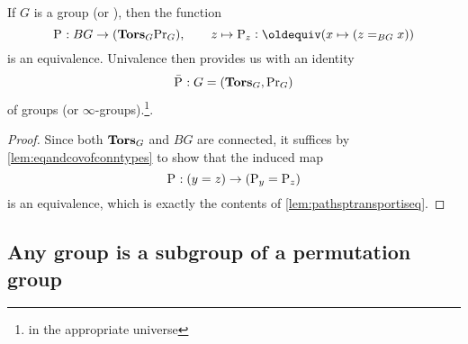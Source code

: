 \begin{theorem}\label{lem:BGbytorsor}
  If $G$ is a group (or \inftygp), then the function
$$\pathsp{}:BG\to(\typetorsor_G\princ G),\qquad z\mapsto \pathsp z\defequi(x\mapsto(z=_{BG}x))$$
is an equivalence.
Univalence then provides us with an identity 
$$\bar{\mathrm{P}_{}}:G=(\mathbf{Tors}_G,\mathrm{Pr}_{{G}})$$ of groups (or $\infty$-groups).\footnote{in the appropriate universe}.
\end{theorem}

\begin{proof}
  Since both $\mathbf{Tors}_G$ and $BG$ are connected, it suffices by \cref{lem:eqandcovofconntypes} to show that the induced map
$$\mathrm{P}_{}:(y=z)\to(\mathrm{P}_{y}= \mathrm{P}_{z})
$$
is an equivalence, which is exactly the contents of \cref{lem:pathsptransportiseq}.  


\end{proof}
\subsection{Any group is a subgroup of a permutation group}
\label{sec:groupssubperm}


